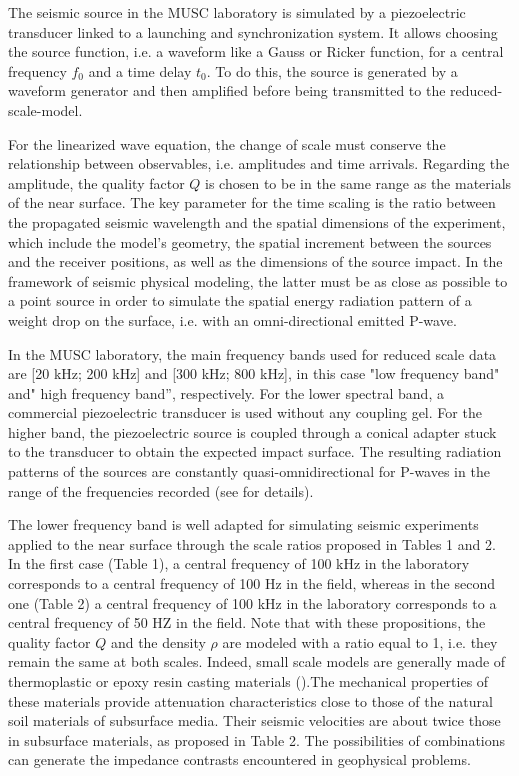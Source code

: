 \documentclass[extra,mreferee]{gji}
\begin{document}
The seismic source in the MUSC laboratory is simulated by a piezoelectric transducer linked to a launching and synchronization system. It allows choosing the source function, i.e. a waveform like a Gauss or Ricker function, for a central frequency $f_{0}$ and a time delay $t_{0}$. To do this, the source is generated by a waveform generator and then amplified before being transmitted to the reduced-scale-model.

For the linearized wave equation, the change of scale must conserve the relationship between observables, i.e. amplitudes and time arrivals. Regarding the amplitude, the quality factor $Q$ is chosen to be in the same range as the materials of the near surface. The key parameter for the time scaling is the ratio between the propagated seismic wavelength and the spatial dimensions of the experiment, which include the model’s geometry, the spatial increment between the sources and the receiver positions, as well as the dimensions of the source impact. In the framework of seismic physical modeling, the latter must be as close as possible to a point source in order to simulate the spatial energy radiation pattern of a weight drop on the surface, i.e. with an omni-directional emitted P-wave.

In the MUSC laboratory, the main frequency bands used for reduced scale data are [20 kHz; 200 kHz] and [300 kHz; 800 kHz], in this case "low frequency band" and" high frequency band”, respectively. For the lower spectral band, a commercial piezoelectric transducer is used without any coupling gel. For the higher band, the piezoelectric source is coupled through a conical adapter stuck to the transducer to obtain the expected impact surface. The resulting radiation patterns of the sources are constantly quasi-omnidirectional for P-waves in the range of the frequencies recorded (see \cite{Bretaudeau_SSM_2011} for details).

The lower frequency band is well adapted for simulating seismic experiments applied to the near surface through the scale ratios proposed in Tables 1 and 2. In the first case (Table 1), a central frequency of 100 kHz in the laboratory corresponds to a central frequency of 100 Hz in the field, whereas in the second one (Table 2) a central frequency of 100 kHz in the laboratory corresponds to a central frequency of 50 HZ in the field. Note that with these propositions, the quality factor $Q$ and the density $\rho$ are modeled with a ratio equal to 1, i.e. they remain the same at both scales. Indeed, small scale models are generally made of thermoplastic or epoxy resin casting materials (\cite{Bretaudeau_FWI_2013}).The mechanical properties of these materials provide attenuation characteristics close to those of the natural soil materials of subsurface media. Their seismic velocities are about twice those in subsurface materials, as proposed in Table 2. The possibilities of combinations can generate the impedance contrasts encountered in geophysical problems. 
\end{document}
